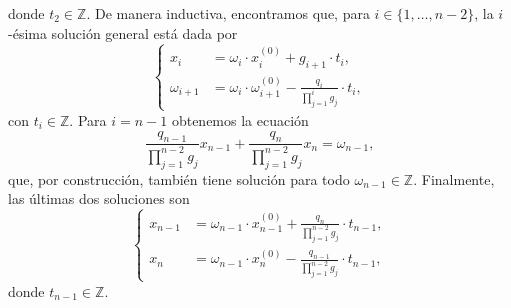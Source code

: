\documentclass[11pt]{article}
\begin{document}
donde $t_2 \in \mathbb{Z}$. De manera inductiva, encontramos que, para $i \in \{1, \ldots, n - 2\}$,
la $i$-ésima solución general está dada por
\begin{equation}
	\begin{cases}
		\label{phase-2:recurrence}
		x_i &= \omega_i \cdot x_i^{(0)} + g_{i+1} \cdot t_i, \\
		\omega_{i+1} &= \omega_i \cdot \omega_{i+1}^{(0)} - \frac{q_i}{\prod_{j=1}^{i}g_j} \cdot t_i,
	\end{cases}
\end{equation}
con $t_i \in \mathbb{Z}$. Para $i = n - 1$ obtenemos la ecuación
\begin{equation*}
	\frac{q_{n-1}}{\prod_{j=1}^{n-2}g_j}x_{n-1} + \frac{q_n}{\prod_{j=1}^{n-2}g_j}x_n =
	\omega_{n-1},
\end{equation*}
que, por construcción, también tiene solución para todo $\omega_{n-1} \in \mathbb{Z}$. Finalmente,
las últimas dos soluciones son
\begin{equation}
	\label{phase-2:eq:last-solutions}
	\begin{cases}
		x_{n-1} &= \omega_{n-1} \cdot x_{n-1}^{(0)} + \frac{q_n}{\prod_{j=1}^{n-2}g_j} \cdot t_{n-1}, \\
		x_n &= \omega_{n-1} \cdot x_{n}^{(0)} - \frac{q_{n-1}}{\prod_{j=1}^{n-2}g_j} \cdot
		t_{n-1},
	\end{cases}
\end{equation}
donde $t_{n-1} \in \mathbb{Z}$.
\end{document}
